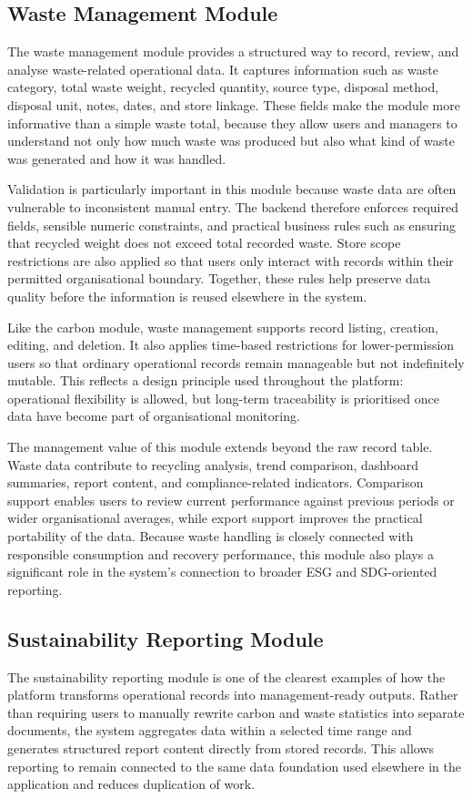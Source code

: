 \documentclass[11pt,a4paper]{article}
\begin{document}
\subsection{Waste Management Module}
The waste management module provides a structured way to record, review, and analyse waste-related operational data. It captures information such as waste category, total waste weight, recycled quantity, source type, disposal method, disposal unit, notes, dates, and store linkage. These fields make the module more informative than a simple waste total, because they allow users and managers to understand not only how much waste was produced but also what kind of waste was generated and how it was handled.

Validation is particularly important in this module because waste data are often vulnerable to inconsistent manual entry. The backend therefore enforces required fields, sensible numeric constraints, and practical business rules such as ensuring that recycled weight does not exceed total recorded waste. Store scope restrictions are also applied so that users only interact with records within their permitted organisational boundary. Together, these rules help preserve data quality before the information is reused elsewhere in the system.

Like the carbon module, waste management supports record listing, creation, editing, and deletion. It also applies time-based restrictions for lower-permission users so that ordinary operational records remain manageable but not indefinitely mutable. This reflects a design principle used throughout the platform: operational flexibility is allowed, but long-term traceability is prioritised once data have become part of organisational monitoring.

The management value of this module extends beyond the raw record table. Waste data contribute to recycling analysis, trend comparison, dashboard summaries, report content, and compliance-related indicators. Comparison support enables users to review current performance against previous periods or wider organisational averages, while export support improves the practical portability of the data. Because waste handling is closely connected with responsible consumption and recovery performance, this module also plays a significant role in the system's connection to broader ESG and SDG-oriented reporting.

\subsection{Sustainability Reporting Module}
The sustainability reporting module is one of the clearest examples of how the platform transforms operational records into management-ready outputs. Rather than requiring users to manually rewrite carbon and waste statistics into separate documents, the system aggregates data within a selected time range and generates structured report content directly from stored records. This allows reporting to remain connected to the same data foundation used elsewhere in the application and reduces duplication of work.
\end{document}
